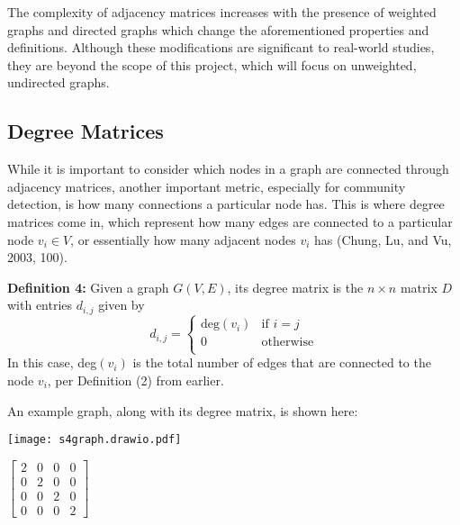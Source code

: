 \documentclass{article}
\begin{document}
\bigskip 

The complexity of adjacency matrices increases with the presence of weighted graphs and directed graphs which change the aforementioned properties and definitions. 
Although these modifications are significant to real-world studies, they are beyond the scope of this project, which will focus on unweighted, undirected graphs.


\bigskip 


\subsection{Degree Matrices}

\bigskip

While it is important to consider which nodes in a graph are connected through adjacency matrices, another important metric, especially for community detection, is how many connections a particular node has.
This is where degree matrices come in, which represent how many edges are connected to a particular node $v_i \in V$, or essentially how many adjacent nodes $v_i$ has (Chung, Lu, and Vu, 2003, 100).

\bigskip 

\textbf{Definition 4:} Given a graph $G(V, E)$, its degree matrix is the $n \times n$ matrix $D$ with entries $d_{i,j}$ given by
\[   
d_{i,j} = 
     \begin{cases}
       \text{deg} (v_i) & \text{if } i = j \\
       0 & \text{otherwise} \\
     \end{cases}
\]
In this case, deg$(v_i)$ is the total number of edges that are connected to the node $v_i$, per Definition (2) from earlier.

\bigskip 

An example graph, along with its degree matrix, is shown here:

\bigskip

\noindent\begin{minipage}{.5\textwidth}
\centering
\texttt{[image: s4graph.drawio.pdf]}
\label{fig:fig3}            
\end{minipage}%
\begin{minipage}{.5\textwidth}
\centering
\vspace{1cm}
 $\begin{bmatrix}
2 & 0 & 0 & 0\\
0 & 2 & 0 & 0\\
0 & 0 & 2 & 0\\
0 & 0 & 0 & 2
\end{bmatrix}$
\vspace{0.88cm}

\label{fig:fig4}            
\end{minipage}
\end{document}
